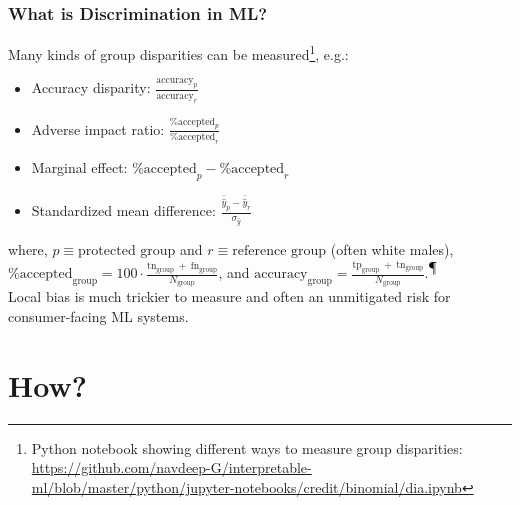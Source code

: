 \documentclass[11pt,
               		aspectratio=169,
               		hyperref={colorlinks}
               		]{beamer}
\begin{document}
		\begin{frame}				
			\frametitle{What is Discrimination in ML?}
			Many kinds of group disparities can be measured\footnote{\tiny{Python notebook showing different ways to measure group disparities: \url{https://github.com/navdeep-G/interpretable-ml/blob/master/python/jupyter-notebooks/credit/binomial/dia.ipynb}}}, e.g.:\\
			\begin{itemize}
				\item Accuracy disparity: $\frac{\text{accuracy}_p}{\text{accuracy}_r}$
				\item Adverse impact ratio: $\frac{\text{\% accepted}_p }{ \text{\% accepted}_r}$
				\item Marginal effect: $\text{\% accepted}_p - \text{\% accepted}_r$
				\item Standardized mean difference: $\frac{\bar{\hat{y}}_p - \bar{\hat{y}}_r}{\sigma_{\hat{y}}}$
			\end{itemize}
			\noindent where, $p \equiv \text{protected group}$ and $r \equiv \text{reference group}$ (often white males),\\
			\vspace{5pt}
			$\text{\% accepted}_\text{group} = 100 \cdot \frac{\text{tn}_\text{group}~+~\text{fn}_\text{group}}{N_\text{group}}$, and $\text{accuracy}_\text{group} = \frac{\text{tp}_\text{group}~+~\text{tn}_\text{group}}{N_\text{group}}$.\textsuperscript{$\mathparagraph$}\\
			\vspace{10pt}
			Local bias is much trickier to measure and often an unmitigated risk for consumer-facing ML systems.
		\end{frame}		
	\section{How?}
\end{document}
